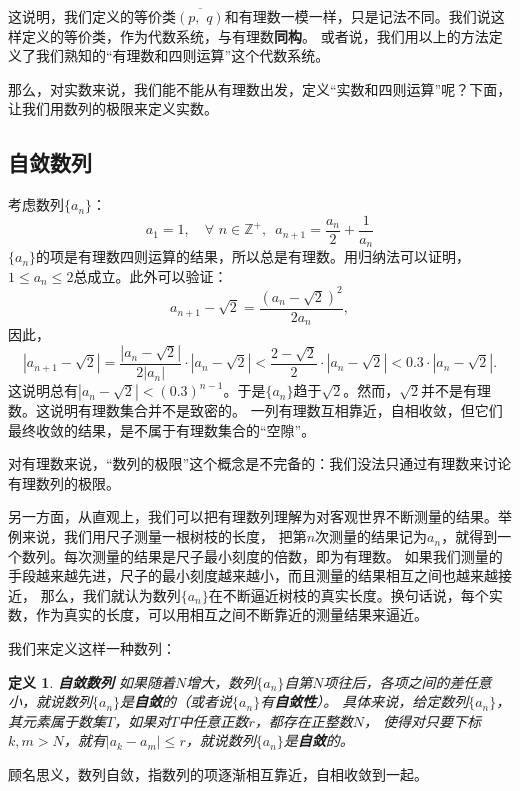 \documentclass[12pt,UTF8]{ctexbook}
\newtheorem{df}{定义}[section]
\begin{document}
这说明，我们定义的等价类$\overline{(p,\,\, q)}$和有理数一模一样，只是记法不同。我们说这样定义的等价类，作为代数系统，与有理数\textbf{同构}。
或者说，我们用以上的方法定义了我们熟知的“有理数和四则运算”这个代数系统。

那么，对实数来说，我们能不能从有理数出发，定义“实数和四则运算”呢？下面，让我们用数列的极限来定义实数。

\subsection{自敛数列}

考虑数列$\{a_n\}$：
$$ a_1 = 1, \quad \forall \,\, n \in \mathbb{Z}^+, \,\,\, a_{n+1} = \frac{a_n}{2} + \frac{1}{a_n} $$
$\{a_n\}$的项是有理数四则运算的结果，所以总是有理数。用归纳法可以证明，$1 \leqslant a_n \leqslant 2$总成立。此外可以验证：
$$ a_{n+1} - \sqrt{2} = \frac{(a_n - \sqrt{2})^2}{2a_n},$$
因此，
$$ |a_{n+1} - \sqrt{2}| = \frac{|a_n - \sqrt{2}|}{2|a_n|} \cdot |a_n - \sqrt{2}| < \frac{2 - \sqrt{2}}{2} \cdot |a_n - \sqrt{2}| < 0.3\cdot |a_n - \sqrt{2}|. $$
这说明总有$|a_n - \sqrt{2}| < (0.3)^{n-1}$。于是$\{a_n\}$趋于$\sqrt{2}$。然而，$\sqrt{2}$并不是有理数。这说明有理数集合并不是致密的。
一列有理数互相靠近，自相收敛，但它们最终收敛的结果，是不属于有理数集合的“空隙”。

对有理数来说，“数列的极限”这个概念是不完备的：我们没法只通过有理数来讨论有理数列的极限。

另一方面，从直观上，我们可以把有理数列理解为对客观世界不断测量的结果。举例来说，我们用尺子测量一根树枝的长度，
把第$n$次测量的结果记为$a_n$，就得到一个数列。每次测量的结果是尺子最小刻度的倍数，即为有理数。
如果我们测量的手段越来越先进，尺子的最小刻度越来越小，而且测量的结果相互之间也越来越接近，
那么，我们就认为数列$\{a_n\}$在不断逼近树枝的真实长度。换句话说，每个实数，作为真实的长度，可以用相互之间不断靠近的测量结果来逼近。

我们来定义这样一种数列：
\begin{df}\textbf{自敛数列}
    如果随着$N$增大，数列$\{a_n\}$自第$N$项往后，各项之间的差任意小，就说数列$\{a_n\}$是\textbf{自敛}的（或者说$\{a_n\}$有\textbf{自敛性}）。
    具体来说，给定数列$\{a_n\}$，其元素属于数集$T$，如果对$T$中任意正数$r$，都存在正整数$N$，
    使得对只要下标$k,m>N$，就有$|a_k - a_m| \leqslant r$，就说数列$\{a_n\}$是\textbf{自敛}的。
\end{df}

顾名思义，数列自敛，指数列的项逐渐相互靠近，自相收敛到一起。
\end{document}
